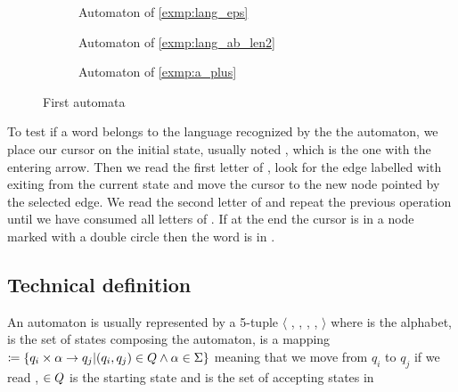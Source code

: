 \begin{figure}[H]
  \centering
  \begin{subfigure}[b]{0.45\textwidth}
    \centering
    \caption{Automaton of \cref{exmp:lang_eps}}
  \end{subfigure}
  \begin{subfigure}[b]{0.45\textwidth}
    \centering
    \caption{Automaton of \cref{exmp:lang_ab_len2}}
  \end{subfigure}
  \begin{subfigure}[b]{0.45\textwidth}
    \centering
    \caption{Automaton of \cref{exmp:a_plus}}
  \end{subfigure}
  \caption{First automata}
  \label{simple_automata}
\end{figure}

To test if a word \word{} belongs to the language recognized by the the automaton, we place our cursor on the initial state, usually noted \qzero{}, which is the one with the entering arrow. Then we read the first letter  of \word{}, look for the edge labelled with  exiting from the current state and move the cursor to the new node pointed by the selected edge. We read the second letter of \word{} and repeat the previous operation until we have consumed all letters of \word{}. If at the end the cursor is in a node marked with a double circle then the word is in \lang{}.

\subsection{Technical definition}
An automaton \automaton{} is usually represented by a 5-tuple $\langle$ \alphabet{}, \states{}, \transition{}, \qzero{}, \qend{} $\rangle$ where \alphabet{} is the alphabet, \states{} is the set of states composing the automaton, \transition{} is a mapping \transition{} $\coloneqq \{q_i \times \alpha{} \rightarrow q_j | (q_i, q_j) \in Q{} \wedge \alpha{} \in \Sigma \} $ meaning that we move from $ q_i $ to $q_j$ if we read , \qzero{} $\in Q{}$ is the starting state and \qend{} is the set of accepting states in \states{}

